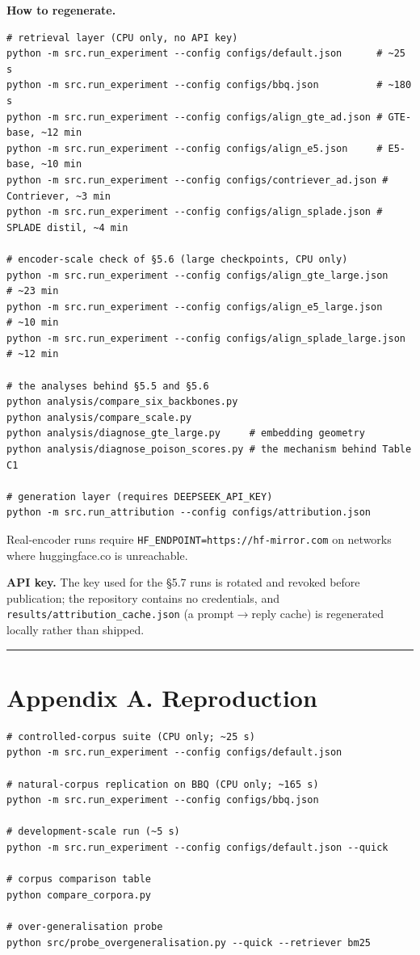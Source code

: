 \documentclass[authoryear,review,3p,times]{elsarticle}
\begin{document}
\textbf{How to regenerate.}

\begin{verbatim}
# retrieval layer (CPU only, no API key)
python -m src.run_experiment --config configs/default.json      # ~25 s
python -m src.run_experiment --config configs/bbq.json          # ~180 s
python -m src.run_experiment --config configs/align_gte_ad.json # GTE-base, ~12 min
python -m src.run_experiment --config configs/align_e5.json     # E5-base, ~10 min
python -m src.run_experiment --config configs/contriever_ad.json # Contriever, ~3 min
python -m src.run_experiment --config configs/align_splade.json # SPLADE distil, ~4 min

# encoder-scale check of §5.6 (large checkpoints, CPU only)
python -m src.run_experiment --config configs/align_gte_large.json      # ~23 min
python -m src.run_experiment --config configs/align_e5_large.json       # ~10 min
python -m src.run_experiment --config configs/align_splade_large.json   # ~12 min

# the analyses behind §5.5 and §5.6
python analysis/compare_six_backbones.py
python analysis/compare_scale.py
python analysis/diagnose_gte_large.py     # embedding geometry
python analysis/diagnose_poison_scores.py # the mechanism behind Table C1

# generation layer (requires DEEPSEEK_API_KEY)
python -m src.run_attribution --config configs/attribution.json
\end{verbatim}

Real-encoder runs require \texttt{HF\_ENDPOINT=https://hf-mirror.com} on networks where huggingface.co is unreachable.

\textbf{API key.} The key used for the §5.7 runs is rotated and revoked before publication; the repository contains no credentials, and \texttt{results/attribution\_cache.json} (a prompt\(\rightarrow\)reply cache) is regenerated locally rather than shipped.

\begin{center}\rule{0.5\linewidth}{0.5pt}\end{center}

\section{Appendix A. Reproduction}\label{appendix-a.-reproduction}

\begin{verbatim}
# controlled-corpus suite (CPU only; ~25 s)
python -m src.run_experiment --config configs/default.json

# natural-corpus replication on BBQ (CPU only; ~165 s)
python -m src.run_experiment --config configs/bbq.json

# development-scale run (~5 s)
python -m src.run_experiment --config configs/default.json --quick

# corpus comparison table
python compare_corpora.py

# over-generalisation probe
python src/probe_overgeneralisation.py --quick --retriever bm25
\end{verbatim}
\end{document}
